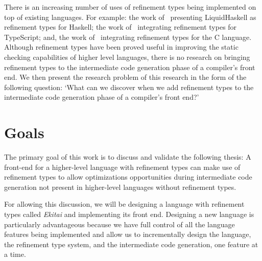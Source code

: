 \documentclass[
    oneside,
    english,
    embeddedlogo,
    noabntexcite
]{ufsc-thesis-rn46-2019}
\begin{document}
There is an increasing number of uses of refinement types being implemented on top of existing languages.
For example: the work of~\textcite{vazou2014liquidhaskell} presenting LiquidHaskell as refinement types for Haskell; the work of~\textcite{vekris2016refinementtypescript} integrating refinement types for TypeScript; and, the work of~\textcite{sammler2021refinedc} integrating refinement types for the C language.
Although refinement types have been proved useful in improving the static checking capabilities of higher level languages, there is no research on bringing refinement types to the intermediate code generation phase of a compiler's front end.
We then present the research problem of this research in the form of the following question: `What can we discover when we add refinement types to the intermediate code generation phase of a compiler's front end?'

\section{Goals}\label{chapter:introduction:sec:goals}

The primary goal of this work is to discuss and validate the following thesis: A front-end for a higher-level language with refinement types can make use of refinement types to allow optimizations opportunities during intermediate code generation not present in higher-level languages without refinement types.

For allowing this discussion, we will be designing a language with refinement types called \textit{Ekitai} and implementing its front end.
Designing a new language is particularly advantageous because we have full control of all the language features being implemented and allow us to incrementally design the language, the refinement type system, and the intermediate code generation, one feature at a time.
\end{document}
